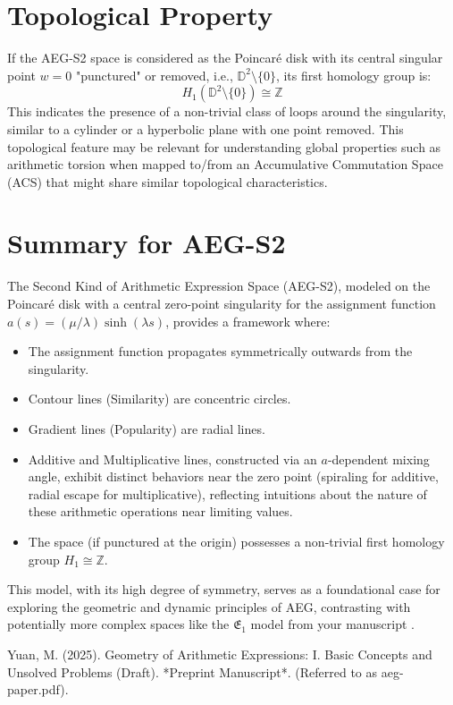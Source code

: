 \documentclass[12pt]{article}
\begin{document}
\section{Topological Property}
If the AEG-S2 space is considered as the Poincaré disk with its central singular point $w=0$ "punctured" or removed, i.e., $\mathbb{D}^2 \setminus \{0\}$, its first homology group is:
$$ H_1(\mathbb{D}^2 \setminus \{0\}) \cong \mathbb{Z} $$
This indicates the presence of a non-trivial class of loops around the singularity, similar to a cylinder or a hyperbolic plane with one point removed. This topological feature may be relevant for understanding global properties such as arithmetic torsion when mapped to/from an Accumulative Commutation Space (ACS) that might share similar topological characteristics.

\section{Summary for AEG-S2}
The Second Kind of Arithmetic Expression Space (AEG-S2), modeled on the Poincaré disk with a central zero-point singularity for the assignment function $a(s) = (\mu/\lambda)\sinh(\lambda s)$, provides a framework where:
\begin{itemize}
    \item The assignment function propagates symmetrically outwards from the singularity.
    \item Contour lines (Similarity) are concentric circles.
    \item Gradient lines (Popularity) are radial lines.
    \item Additive and Multiplicative lines, constructed via an $a$-dependent mixing angle, exhibit distinct behaviors near the zero point (spiraling for additive, radial escape for multiplicative), reflecting intuitions about the nature of these arithmetic operations near limiting values.
    \item The space (if punctured at the origin) possesses a non-trivial first homology group $H_1 \cong \mathbb{Z}$.
\end{itemize}
This model, with its high degree of symmetry, serves as a foundational case for exploring the geometric and dynamic principles of AEG, contrasting with potentially more complex spaces like the $\mathfrak{E}_1$ model from your manuscript \cite{YuanAEG2025}.

\begin{thebibliography}{9}
     Yuan, M. (2025). Geometry of Arithmetic Expressions: I. Basic Concepts and Unsolved Problems (Draft). *Preprint Manuscript*. (Referred to as aeg-paper.pdf).
\end{thebibliography}
\end{document}

